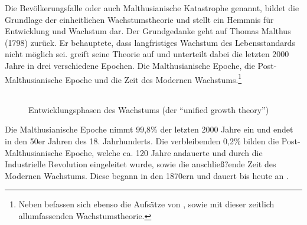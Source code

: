 %
Die Bevölkerungsfalle oder auch Malthusianische Katastrophe genannt, bildet die Grundlage der einheitlichen Wachstumstheorie und stellt ein Hemmnis für Entwicklung und Wachstum dar. Der Grundgedanke geht auf Thomas Malthus (1798) zurück. Er behauptete, dass langfristiges Wachstum des Lebensstandards nicht möglich sei. \cite{Galor.2011} greift seine Theorie auf und unterteilt dabei die letzten 2000 Jahre in drei verschiedene Epochen. Die Malthusianische Epoche, die Post-Malthusianische Epoche und die Zeit des Modernen Wachstums.\footnote{Neben \cite{Galor.2006} befassen sich ebenso die Aufsätze von \cite{Hansen.2002}, sowie \cite{Ashraf.2008} mit dieser zeitlich allumfassenden Wachstumstheorie.}\\

		\begin{figure}[htbp]
			\centering 
			\begin{tabular}{@{}r@{}}  
			\end{tabular}
			\caption[Entwicklungsphasen des Wachstums]{Entwicklungsphasen des Wachstums (der "`unified growth theory"')}\label{Epochen}
		\end{figure}
%		
Die Malthusianische Epoche nimmt 99,8{\%} der letzten 2000 Jahre ein und endet in den 50er Jahren des 18. Jahrhunderts. Die verbleibenden 0,2{\%} bilden die Post-Malthusianische Epoche, welche ca. 120 Jahre andauerte und durch die Industrielle Revolution eingeleitet wurde, sowie die anschließ?ende Zeit des Modernen Wachstums. Diese begann in den 1870ern und dauert bis heute an \cite{Galor.2014}.\\
%
